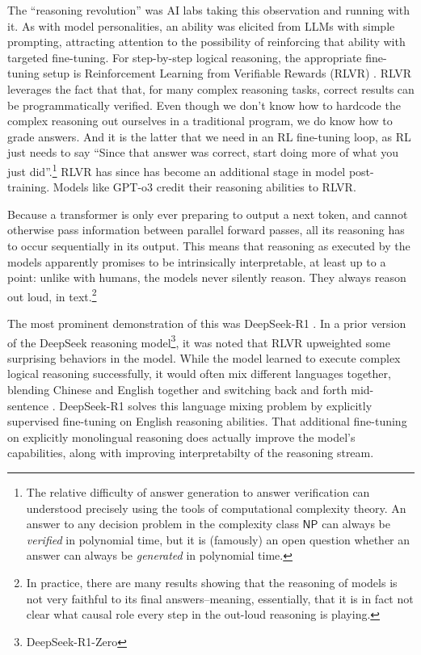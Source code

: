 The ``reasoning revolution'' was AI labs taking this observation and running
with it. As with model personalities, an ability was elicited from LLMs with
simple prompting, attracting attention to the possibility of reinforcing that
ability with targeted fine-tuning. For step-by-step logical reasoning, the
appropriate fine-tuning setup is Reinforcement Learning from Verifiable Rewards
(RLVR) \cite{lambert2025tulu}. RLVR leverages the fact that that, for many
complex reasoning tasks, correct results can be programmatically verified. Even
though we don't know how to hardcode the complex reasoning out ourselves in a
traditional program, we do know how to grade answers. And it is the latter that
we need in an RL fine-tuning loop, as RL just needs to say ``Since that answer
was correct, start doing more of what you just did''.\footnote{The relative
difficulty of answer generation to answer verification can understood precisely
using the tools of computational complexity theory. An answer to any decision
problem in the complexity class $\mathsf{NP}$ can always be \emph{verified} in
polynomial time, but it is (famously) an open question whether an answer can
always be \emph{generated} in polynomial time.} RLVR has since has become an
additional stage in model post-training. Models like GPT-o3 credit their
reasoning abilities to RLVR.

Because a transformer is only ever preparing to output a next token, and cannot
otherwise pass information between parallel forward passes, all its reasoning
has to occur sequentially in its output. This means that reasoning as executed
by the models apparently promises to be intrinsically interpretable, at least
up to a point: unlike with humans, the models never silently reason. They
always reason out loud, in text.\footnote{In practice, there are many results
showing that the reasoning of models is not very faithful to its final
answers--meaning, essentially, that it is in fact not clear what causal role
every step in the out-loud reasoning is playing.}

The most prominent demonstration of this was DeepSeek-R1
\cite{deepseekai2025deepseek}. In a prior version of the DeepSeek reasoning
model\footnote{DeepSeek-R1-Zero}, it was noted that RLVR upweighted some
surprising behaviors in the model. While the model learned to execute complex
logical reasoning successfully, it would often mix different languages
together, blending Chinese and English together and switching back and forth
mid-sentence \cite{deepseekai2025deepseek}. DeepSeek-R1 solves this language
mixing problem by explicitly supervised fine-tuning on English reasoning
abilities. That additional fine-tuning on explicitly monolingual reasoning does
actually improve the model's capabilities, along with improving interpretabilty
of the reasoning stream.

